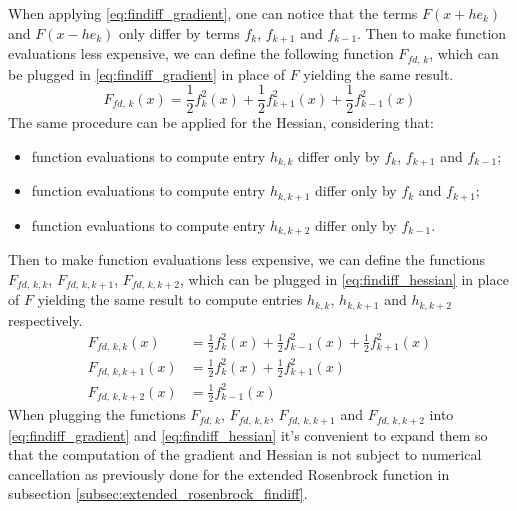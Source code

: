 When applying \ref{eq:findiff_gradient}, one can notice that the terms $F(x + he_k)$ and $F(x-he_k)$ only differ by terms $f_k$, $f_{k+1}$ and $f_{k-1}$.
Then to make function evaluations less expensive, we can define the following function $F_{\textit{fd},\,k}$, which can be plugged in \ref{eq:findiff_gradient} in place of $F$ yielding the same result.
\[
F_{\textit{fd},\,k}(x) = \frac12 f_k^2(x) + \frac12 f_{k+1}^2(x) + \frac12 f_{k-1}^2(x)
\]
The same procedure can be applied for the Hessian, considering that:
\begin{itemize}
    \item function evaluations to compute entry $h_{k,k}$ differ only by $f_k$, $f_{k+1}$ and $f_{k-1}$;
    \item function evaluations to compute entry $h_{k,k+1}$ differ only by $f_k$ and $f_{k+1}$;
    \item function evaluations to compute entry $h_{k,k+2}$ differ only by $f_{k-1}$.
\end{itemize}
Then to make function evaluations less expensive, we can define the functions $F_{\textit{fd},\,k,k}$, $F_{\textit{fd},\,k,k+1}$, $F_{\textit{fd},\,k,k+2}$, which can be plugged in \ref{eq:findiff_hessian} in place of $F$ yielding the same result to compute entries $h_{k,k}$, $h_{k,k+1}$ and $h_{k,k+2}$ respectively.
\begin{align*}
F_{\textit{fd},\,k,k}(x) &= \frac12 f_k^2(x) + \frac12 f_{k-1}^2(x) + \frac12 f_{k+1}^2(x)\\
F_{\textit{fd},\,k,k+1}(x) &= \frac12 f_k^2(x) + \frac12 f_{k+1}^2(x)\\
F_{\textit{fd},\,k,k+2}(x) &= \frac12 f_{k-1}^2(x)
\end{align*}
When plugging the functions $F_{fd,\,k}$, $F_{fd,\,k,k}$, $F_{\textit{fd},\,k,k+1}$ and $F_{\textit{fd},\,k,k+2}$ into \ref{eq:findiff_gradient} and \ref{eq:findiff_hessian} it's convenient to expand them so that the computation of the gradient and Hessian is not subject to numerical cancellation as previously done for the extended Rosenbrock function in subsection \ref{subsec:extended_rosenbrock_findiff}.